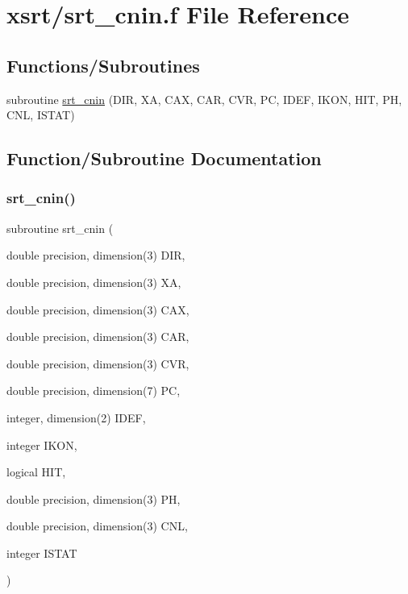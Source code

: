 \hypertarget{srt__cnin_8f}{}\section{xsrt/srt\+\_\+cnin.f File Reference}
\label{srt__cnin_8f}
\subsection*{Functions/\+Subroutines}
\begin{DoxyCompactItemize}
\item 
subroutine \hyperlink{srt__cnin_8f_a84c5633d13799460dcfb90f738633d7d}{srt\+\_\+cnin} (D\+IR, XA, C\+AX, C\+AR, C\+VR, PC, I\+D\+EF, I\+K\+ON, H\+IT, PH, C\+NL, I\+S\+T\+AT)
\end{DoxyCompactItemize}


\subsection{Function/\+Subroutine Documentation}
\mbox{\label{srt__cnin_8f_a84c5633d13799460dcfb90f738633d7d}} 
\subsubsection{\texorpdfstring{srt\+\_\+cnin()}{srt\_cnin()}}
{\footnotesize\ttfamily subroutine srt\+\_\+cnin (\begin{DoxyParamCaption}\item[{double precision, dimension(3)}]{D\+IR,  }\item[{double precision, dimension(3)}]{XA,  }\item[{double precision, dimension(3)}]{C\+AX,  }\item[{double precision, dimension(3)}]{C\+AR,  }\item[{double precision, dimension(3)}]{C\+VR,  }\item[{double precision, dimension(7)}]{PC,  }\item[{integer, dimension(2)}]{I\+D\+EF,  }\item[{integer}]{I\+K\+ON,  }\item[{logical}]{H\+IT,  }\item[{double precision, dimension(3)}]{PH,  }\item[{double precision, dimension(3)}]{C\+NL,  }\item[{integer}]{I\+S\+T\+AT }\end{DoxyParamCaption})}

